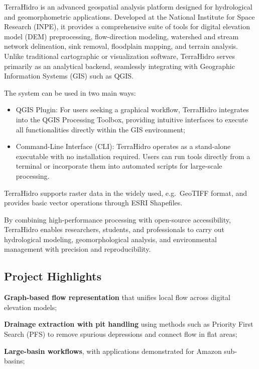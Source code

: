 \documentclass[
]{book}
\theoremstyle{definition}
\theoremstyle{definition}
\theoremstyle{definition}
\theoremstyle{definition}
\theoremstyle{remark}
\begin{document}
TerraHidro is an advanced geospatial analysis platform designed for hydrological and geomorphometric applications. Developed at the National Institute for Space Research (INPE), it provides a comprehensive suite of tools for digital elevation model (DEM) preprocessing, flow-direction modeling, watershed and stream network delineation, sink removal, floodplain mapping, and terrain analysis. Unlike traditional cartographic or visualization software, TerraHidro serves primarily as an analytical backend, seamlessly integrating with Geographic Information Systems (GIS) such as QGIS.

The system can be used in two main ways:

\begin{itemize}
\item
  QGIS Plugin: For users seeking a graphical workflow, TerraHidro integrates into the QGIS Processing Toolbox, providing intuitive interfaces to execute all functionalities directly within the GIS environment;
\item
  Command-Line Interface (CLI): TerraHidro operates as a stand-alone executable with no installation required. Users can run tools directly from a terminal or incorporate them into automated scripts for large-scale processing.
\end{itemize}

TerraHidro supports raster data in the widely used, e.g.~GeoTIFF format, and provides basic vector operations through ESRI Shapefiles.

By combining high-performance processing with open-source accessibility, TerraHidro enables researchers, students, and professionals to carry out hydrological modeling, geomorphological analysis, and environmental management with precision and reproducibility.

\subsection*{Project Highlights}\label{project-highlights}

\textbf{Graph-based flow representation} that unifies local flow across digital elevation models;

\textbf{Drainage extraction with pit handling} using methods such as Priority First Search (PFS) to remove spurious depressions and connect flow in flat areas;

\textbf{Large-basin workflows}, with applications demonstrated for Amazon sub-basins;
\end{document}

